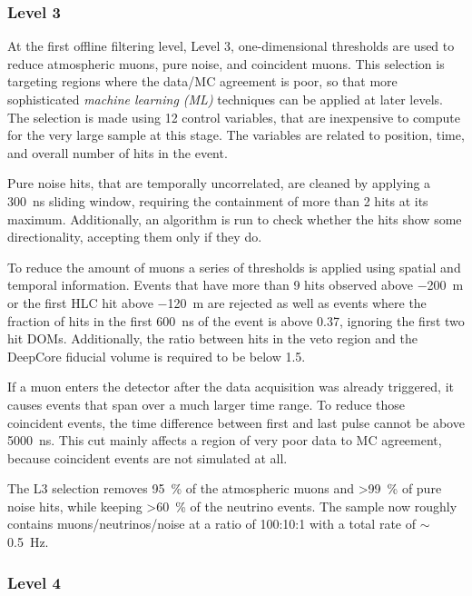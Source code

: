 \subsubsection{Level 3} 

At the first offline filtering level, Level 3, one-dimensional thresholds are used to reduce atmospheric muons, pure noise, and coincident muons. This selection is targeting regions where the data/MC agreement is poor, so that more sophisticated \textit{machine learning (ML)} techniques can be applied at later levels. The selection is made using 12 control variables, that are inexpensive to compute for the very large sample at this stage. The variables are related to position, time, and overall number of hits in the event.

Pure noise hits, that are temporally uncorrelated, are cleaned by applying a \SI{300}{\nano\second} sliding window, requiring the containment of more than 2 hits at its maximum. Additionally, an algorithm is run to check whether the hits show some directionality, accepting them only if they do.

To reduce the amount of muons a series of thresholds is applied using spatial and temporal information. Events that have more than 9 hits observed above \SI{-200}{\meter} or the first HLC hit above \SI{-120}{\meter} are rejected as well as events where the fraction of hits in the first \SI{600}{\nano\second} of the event is above 0.37, ignoring the first two hit DOMs. Additionally, the ratio between hits in the veto region and the DeepCore fiducial volume is required to be below 1.5.

If a muon enters the detector after the data acquisition was already triggered, it causes events that span over a much larger time range. To reduce those coincident events, the time difference between first and last pulse cannot be above \SI{5000}{\nano\second}. This cut mainly affects a region of very poor data to MC agreement, because coincident events are not simulated at all.

The L3 selection removes \SI{95}{\percent} of the atmospheric muons and >\SI{99}{\percent} of pure noise hits, while keeping >\SI{60}{\percent} of the neutrino events. The sample now roughly contains muons/neutrinos/noise at a ratio of 100:10:1 with a total rate of $\sim$\SI{0.5}{\hertz}.


\subsubsection{Level 4} 

